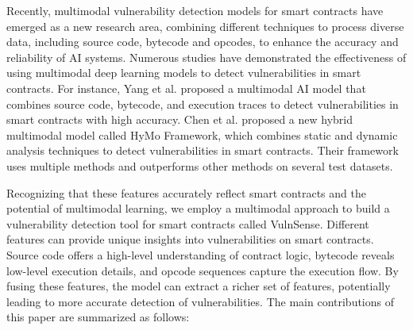  Recently, multimodal vulnerability detection models for smart contracts have emerged as a new research area, combining different techniques to process diverse data, including source code, bytecode and opcodes, to enhance the accuracy and reliability of AI systems. Numerous studies have demonstrated the effectiveness of using multimodal deep learning models to detect vulnerabilities in smart contracts. For instance, Yang et al. \cite{novel_ai_smartcontract} proposed a multimodal AI model that combines source code, bytecode, and execution traces to detect vulnerabilities in smart contracts with high accuracy. Chen et al. \cite{khodadadi2023hymo} proposed a new hybrid multimodal model called HyMo Framework, which combines static and dynamic analysis techniques to detect vulnerabilities in smart contracts. Their framework uses multiple methods and outperforms other methods on several test datasets.
 
Recognizing that these features accurately reflect smart contracts and the potential of multimodal learning, we employ a multimodal approach to build a vulnerability detection tool for smart contracts called VulnSense. Different features can provide unique insights into vulnerabilities on smart contracts. Source code offers a high-level understanding of contract logic, bytecode reveals low-level execution details, and opcode sequences capture the execution flow. By fusing these features, the model can extract a richer set of features, potentially leading to more accurate detection of vulnerabilities. The main contributions of this paper are summarized as follows:


